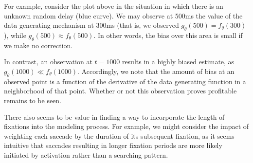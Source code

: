 \documentclass{article}
\begin{document}
For example, consider the plot above in the situation in which there is an unknown random delay (blue curve). We may observe at 500ms the value of the data generating mechanism at 300ms (that is, we observed $g_{\theta}(500) = f_{\theta}(300)$), while $g_{\theta}(500) \approx f_{\theta}(500)$. In other words, the bias over this area is small if we make no correction.

In contrast, an observation at $t = 1000$ results in a highly biased estimate, as $g_{\theta}(1000) \ll f_{\theta}(1000)$. Accordingly, we note that the amount of bias at an observed point is a function of the derivative of the data generating function in a neighborhood of that point. Whether or not this observation proves profitable remains to be seen.

There also seems to be value in finding a way to incorporate the length of fixations into the modeling process. For example, we might consider the impact of weighting each saccade by the duration of its subsequent fixation, as it seems intuitive that saccades resulting in longer fixation periods are more likely initiated by activation rather than a searching pattern.



\end{document}
